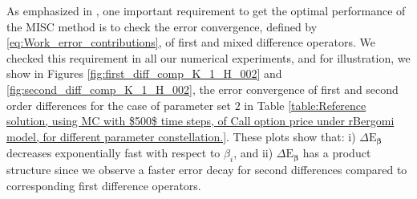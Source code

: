 \begin{remark}
As emphasized in \cite{haji2016multi}, one important requirement to get the optimal performance of the MISC method is to check  the error convergence, defined by \eqref{eq:Work_error_contributions},  of first and mixed difference operators. We checked this requirement in all our numerical experiments, and for illustration, we show in Figures  \ref{fig:first_diff_comp_K_1_H_002} and \ref{fig:second_diff_comp_K_1_H_002}, the error convergence of first and second order differences for the case of parameter set $2$ in Table \ref{table:Reference solution, using MC with $500$ time steps, of Call option price under rBergomi model, for different parameter constellation.}.  These plots show that: i) $\Delta \text{E}_{\boldsymbol{\beta}}$ decreases exponentially fast with respect to $\beta_i$, and ii) $\Delta \text{E}_{\boldsymbol{\beta}}$ has a  product structure since  we  observe  a faster error decay for second differences compared to corresponding first difference operators.
\end{remark} 

